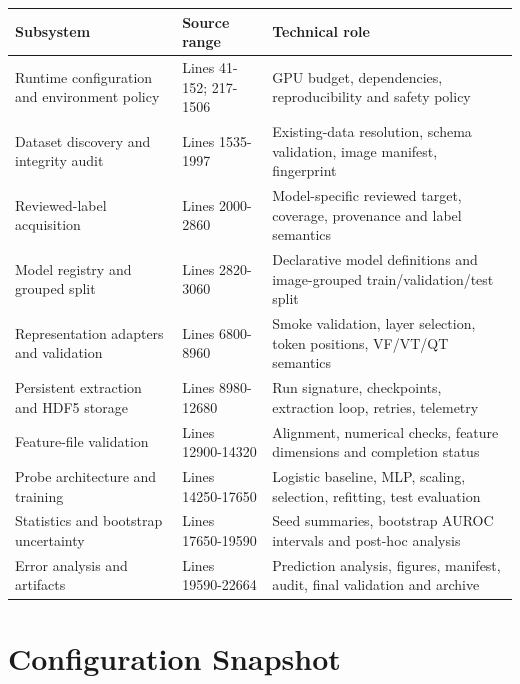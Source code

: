 \documentclass[11pt,a4paper]{article}
\begin{document}
\begin{longtable}{L{0.29\textwidth}L{0.21\textwidth}L{0.40\textwidth}}

\toprule\textbf{Subsystem} & \textbf{Source range} & \textbf{Technical role}\\\midrule\endhead

Runtime configuration and environment policy & Lines 41-152; 217-1506 & GPU budget, dependencies, reproducibility and safety policy\\

Dataset discovery and integrity audit & Lines 1535-1997 & Existing-data resolution, schema validation, image manifest, fingerprint\\

Reviewed-label acquisition & Lines 2000-2860 & Model-specific reviewed target, coverage, provenance and label semantics\\

Model registry and grouped split & Lines 2820-3060 & Declarative model definitions and image-grouped train/validation/test split\\

Representation adapters and validation & Lines 6800-8960 & Smoke validation, layer selection, token positions, VF/VT/QT semantics\\

Persistent extraction and HDF5 storage & Lines 8980-12680 & Run signature, checkpoints, extraction loop, retries, telemetry\\

Feature-file validation & Lines 12900-14320 & Alignment, numerical checks, feature dimensions and completion status\\

Probe architecture and training & Lines 14250-17650 & Logistic baseline, MLP, scaling, selection, refitting, test evaluation\\

Statistics and bootstrap uncertainty & Lines 17650-19590 & Seed summaries, bootstrap AUROC intervals and post-hoc analysis\\

Error analysis and artifacts & Lines 19590-22664 & Prediction analysis, figures, manifest, audit, final validation and archive\\

\bottomrule\end{longtable}

\section{Configuration Snapshot}
\end{document}
